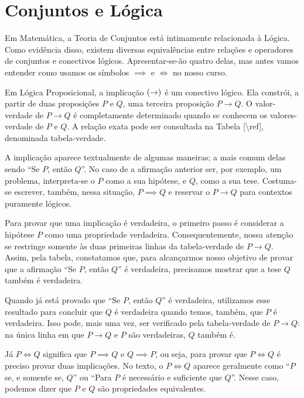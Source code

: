 \section{Conjuntos e Lógica}



Em Matemática, a Teoria de Conjuntos está intimamente relacionada à Lógica.
Como evidência disso, existem diversas equivalências entre relações e operadores de conjuntos e conectivos lógicos.
Apresentar-se-ão quatro delas, mas antes vamos entender como usamos os símbolos $ \implies$ e $\iff$ no nosso curso.

Em Lógica Proposicional, a implicação $\left(\to\right) $ é um conectivo lógico. 
Ela constrói, a partir de duas proposições $P$ e $Q$, uma terceira proposição $P \to Q$.
O valor-verdade de $P \to Q$ é completamente determinado quando se conhecem os valores-verdade de $P$ e $Q$.
A relação exata pode ser consultada na Tabela [\textbackslash ref], denominada tabela-verdade.

A implicação aparece textualmente de algumas maneiras; a mais comum delas sendo ``Se $P$, então $Q$''.
No caso de a afirmação anterior ser, por exemplo, um problema, interpreta-se o $P$ como a sua hipótese, e $Q$, como a sua tese.
Costuma-se escrever, também, nessa situação, $P \implies Q$ e reservar o $P \to Q$ para contextos puramente lógicos.

Para provar que uma implicação é verdadeira, o primeiro passo é considerar a hipótese $P$ como uma propriedade verdadeira.
Consequentemente, nossa atenção se restringe somente às duas primeiras linhas da tabela-verdade de $P \to Q$.
Assim, pela tabela, constatamos que, para alcançarmos nosso objetivo de provar que a afirmação ``Se $P$, então $Q$'' é verdadeira,
precisamos mostrar que a tese $Q$ também é verdadeira.

Quando já está provado que ``Se $P$, então $Q$'' é verdadeira, 
utilizamos esse resultado para concluir que $Q$ é verdadeira quando temos, também, que $P$ é verdadeira.
Isso pode, mais uma vez, ser verificado pela tabela-verdade de $P \to Q$:
na única linha em que $P \to Q$ e $P$ são verdadeiras, $Q$ também é.

Já $P \iff Q$ significa que $P \implies Q$ e $Q \implies P$, ou seja, para provar que $P \iff Q$ é preciso provar duas implicações. No texto, o $ P \iff Q$ aparece geralmente como ``$P$ se, e somente se, $Q$'' ou ``Para $P$ é necessário e suficiente que $Q$''. Nesse caso, podemos dizer que $P$ e $Q$ são propriedades equivalentes.

